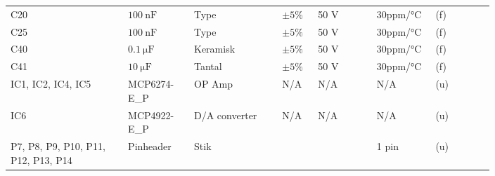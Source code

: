 \begin{table}[h!]
\begin{threeparttable}
\begin{tabular}{p{0.2\linewidth}p{0.1\linewidth}p{0.15\linewidth}p{0.05\linewidth}p{0.1\linewidth}p{0.1\linewidth}p{0.1\linewidth}}
C20 & $\SI{100}{\nano\farad}$ & Type & $\pm 5\%$ & 50 \si{\volt} & 30ppm/\si{\celsius} & (f)\\
C25 & $\SI{100}{\nano\farad}$ & Type & $\pm 5\%$ & 50 \si{\volt} & 30ppm/\si{\celsius} & (f)\\
C40 & $\SI{0.1}{\micro\farad}$ & Keramisk & $\pm 5\%$ & 50 \si{\volt} & 30ppm/\si{\celsius} & (f)\\
C41 & $\SI{10}{\micro\farad}$ & Tantal & $\pm 5\%$ & 50 \si{\volt} & 30ppm/\si{\celsius} & (f)\\
\midrule
IC1, IC2, IC4, IC5 & MCP6274-E\_P & OP Amp & N/A & N/A & N/A & (u) \\
IC6 & MCP4922-E\_P & D/A converter & N/A & N/A & N/A & (u) \\
P7, P8, P9, P10, P11, P12, P13, P14 & Pinheader & Stik &  &  & 1 pin & (u) \\

\end{tabular}
\end{threeparttable}
\end{table}
